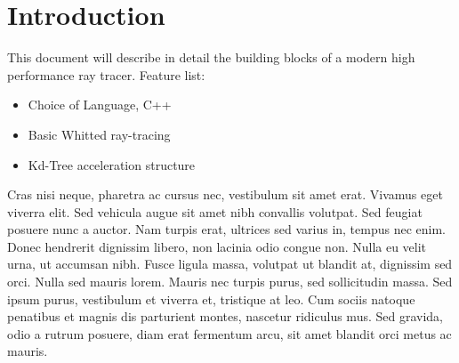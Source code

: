 \chapter{Introduction}
This document will describe in detail the building blocks of a modern high performance ray tracer.
Feature list:
\begin{itemize}
\item Choice of Language, C++
\item Basic Whitted ray-tracing
\item Kd-Tree acceleration structure
\end{itemize}
Cras nisi neque, pharetra ac cursus nec, vestibulum sit amet erat. Vivamus eget viverra elit. Sed vehicula augue sit amet nibh convallis volutpat. Sed feugiat posuere nunc a auctor. Nam turpis erat, ultrices sed varius in, tempus nec enim. Donec hendrerit dignissim libero, non lacinia odio congue non. Nulla eu velit urna, ut accumsan nibh. Fusce ligula massa, volutpat ut blandit at, dignissim sed orci. Nulla sed mauris lorem. Mauris nec turpis purus, sed sollicitudin massa. Sed ipsum purus, vestibulum et viverra et, tristique at leo. Cum sociis natoque penatibus et magnis dis parturient montes, nascetur ridiculus mus. Sed gravida, odio a rutrum posuere, diam erat fermentum arcu, sit amet blandit orci metus ac mauris.
